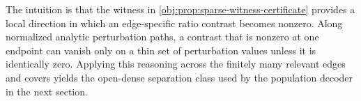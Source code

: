 The intuition is that the witness in \cref{obj:prop:sparse-witness-certificate} provides a local direction in which an edge-specific ratio contrast becomes nonzero. Along normalized analytic perturbation paths, a contrast that is nonzero at one endpoint can vanish only on a thin set of perturbation values unless it is identically zero. Applying this reasoning across the finitely many relevant edges and covers yields the open-dense separation class used by the population decoder in the next section.
